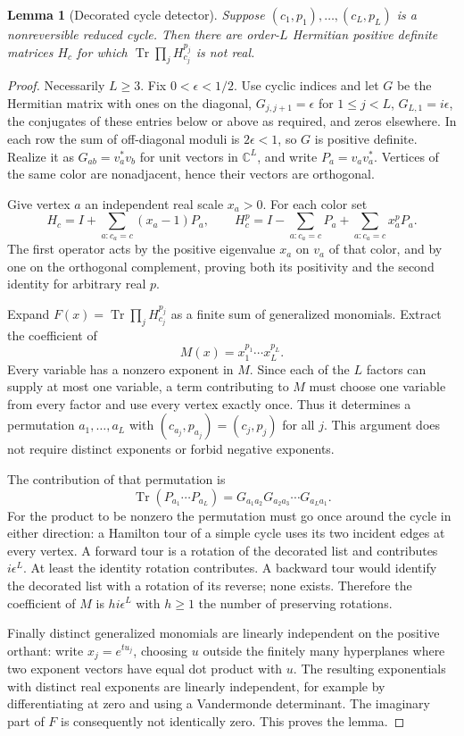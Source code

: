 \documentclass[11pt]{article}
\newtheorem{lemma}[theorem]{Lemma}
\DeclareMathOperator{\Tr}{Tr}
\newcommand{\C}{\mathbb C}
\begin{document}
\begin{lemma}[Decorated cycle detector]\label{l:cycle}
Suppose $(c_1,p_1),\ldots,(c_L,p_L)$ is a nonreversible reduced cycle. Then there are order-$L$ Hermitian positive definite matrices $H_c$ for which $\Tr\prod_j H_{c_j}^{p_j}$ is not real.
\end{lemma}
\begin{proof}
Necessarily $L\ge3$. Fix $0<\epsilon<1/2$. Use cyclic indices and let $G$ be the Hermitian matrix with ones on the diagonal, $G_{j,j+1}=\epsilon$ for $1\le j<L$, $G_{L,1}=i\epsilon$, the conjugates of these entries below or above as required, and zeros elsewhere. In each row the sum of off-diagonal moduli is $2\epsilon<1$, so $G$ is positive definite. Realize it as $G_{ab}=v_a^*v_b$ for unit vectors in $\C^L$, and write $P_a=v_av_a^*$. Vertices of the same color are nonadjacent, hence their vectors are orthogonal.

Give vertex $a$ an independent real scale $x_a>0$. For each color set
\[
 H_c=I+\sum_{a:c_a=c}(x_a-1)P_a,\qquad
 H_c^p=I-\sum_{a:c_a=c}P_a+\sum_{a:c_a=c}x_a^pP_a.
\]
The first operator acts by the positive eigenvalue $x_a$ on $v_a$ of that color, and by one on the orthogonal complement, proving both its positivity and the second identity for arbitrary real $p$.

Expand $F(x)=\Tr\prod_j H_{c_j}^{p_j}$ as a finite sum of generalized monomials. Extract the coefficient of
\[
 M(x)=x_1^{p_1}\cdots x_L^{p_L}.
\]
Every variable has a nonzero exponent in $M$. Since each of the $L$ factors can supply at most one variable, a term contributing to $M$ must choose one variable from every factor and use every vertex exactly once. Thus it determines a permutation $a_1,\ldots,a_L$ with $(c_{a_j},p_{a_j})=(c_j,p_j)$ for all $j$. This argument does not require distinct exponents or forbid negative exponents.

The contribution of that permutation is
\[
 \Tr(P_{a_1}\cdots P_{a_L})=G_{a_1a_2}G_{a_2a_3}\cdots G_{a_La_1}.
\]
For the product to be nonzero the permutation must go once around the cycle in either direction: a Hamilton tour of a simple cycle uses its two incident edges at every vertex. A forward tour is a rotation of the decorated list and contributes $i\epsilon^L$. At least the identity rotation contributes. A backward tour would identify the decorated list with a rotation of its reverse; none exists. Therefore the coefficient of $M$ is $h i\epsilon^L$ with $h\ge1$ the number of preserving rotations.

Finally distinct generalized monomials are linearly independent on the positive orthant: write $x_j=e^{t u_j}$, choosing $u$ outside the finitely many hyperplanes where two exponent vectors have equal dot product with $u$. The resulting exponentials with distinct real exponents are linearly independent, for example by differentiating at zero and using a Vandermonde determinant. The imaginary part of $F$ is consequently not identically zero. This proves the lemma.
\end{proof}
\end{document}

